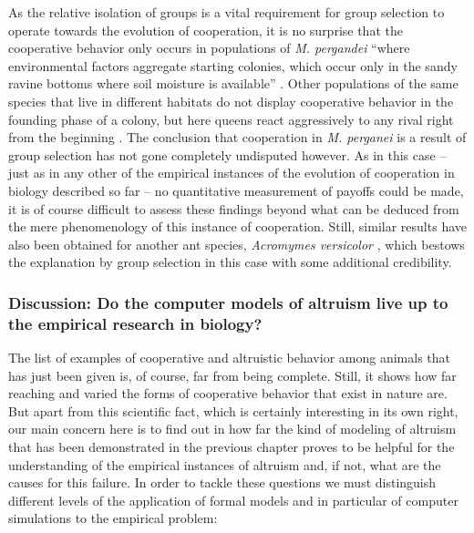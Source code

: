 As the relative isolation of groups is a vital requirement for group selection
to operate towards the evolution of cooperation, it is no surprise that the
cooperative behavior only occurs in populations of {\em M. pergandei} ``where
environmental factors aggregate starting colonies, which occur only in the
sandy ravine bottoms where soil moisture is available'' \cite[p.\ 
160]{dugatkin:1997}. Other populations of the same species that live in
different habitats do not display cooperative behavior in the founding phase
of a colony, but here queens react aggressively to any rival right from the
beginning \cite[p.\  160/161]{dugatkin:1997}. The conclusion that cooperation
in {\em M. perganei} is a result of group selection has not gone completely
undisputed however. As in this case -- just as in any other of the empirical
instances of the evolution of cooperation in biology described so far -- no
quantitative measurement of payoffs could be made, it is of course difficult
to assess these findings beyond what can be deduced from the mere
phenomenology of this instance of cooperation. Still, similar results have
also been obtained for another ant species, {\em Acromymes versicolor}
\cite[p.\ 161]{dugatkin:1997}, which bestows the explanation by group selection
in this case with some additional credibility.

\subsubsection{Discussion: Do the computer models of altruism live up to the
empirical research in biology?}

The list of examples of cooperative and altruistic behavior among animals
that has just been given is, of course, far from being complete. Still, it
shows how far reaching and varied the forms of cooperative behavior that
exist in nature are. But apart from this scientific fact, which is
certainly interesting in its own right, our main concern here is to find out
in how far the kind of modeling of altruism that has been demonstrated in the
previous chapter proves to be helpful for the understanding of the empirical
instances of altruism and, if not, what are the causes for this failure. In
order to tackle these questions we must distinguish different levels of the
application of formal models and in particular of computer simulations to the
empirical problem:\label{twoLevelDistinction}

